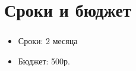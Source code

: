\section{Сроки и бюджет}

\begin{frame}
\frametitle{\insertsection} 
\framesubtitle{\insertsubsection}
\begin{itemize}
    \item Сроки: 2 месяца
    \item Бюджет: 500р.
\end{itemize}
\end{frame}